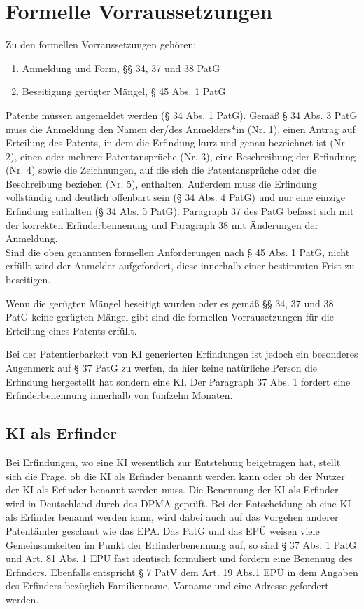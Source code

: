 \section{Formelle Vorraussetzungen}

Zu den formellen Vorraussetzungen gehören:
\begin{enumerate}
    \item Anmeldung und Form, §§ 34, 37 und 38 PatG 
    \vspace{-0.11in} 
    \item Beseitigung gerügter Mängel, § 45 Abs. 1 PatG
\end{enumerate}

Patente müssen angemeldet werden (§ 34 Abs. 1 PatG). 
Gemäß § 34 Abs. 3 PatG muss die Anmeldung den Namen der/des Anmelders*in 
(Nr. 1), einen Antrag auf Erteilung des Patents, 
in dem die Erfindung kurz und genau bezeichnet ist (Nr. 2), 
einen oder mehrere Patentansprüche (Nr. 3), 
eine Beschreibung der Erfindung (Nr. 4) sowie die Zeichnungen, 
auf die sich die Patentansprüche oder die Beschreibung beziehen (Nr. 5), 
enthalten. 
Außerdem muss die Erfindung vollständig und deutlich offenbart sein (§ 34 Abs. 4 PatG) 
und nur eine einzige Erfindung enthalten (§ 34 Abs. 5 PatG). 
Paragraph 37 des PatG befasst sich mit der korrekten Erfinderbennenung 
und Paragraph 38 mit Änderungen der Anmeldung. 
\\

Sind die oben genannten formellen Anforderungen nach § 45 Abs. 1 PatG, 
nicht erfüllt wird der Anmelder aufgefordert, 
diese innerhalb einer bestimmten Frist zu beseitigen.

Wenn die gerügten Mängel beseitigt wurden 
oder es gemäß §§ 34, 37 und 38 PatG keine gerügten Mängel gibt 
sind die formellen Vorrausetzungen für die Erteilung eines Patents erfüllt.

Bei der Patentierbarkeit von KI generierten Erfindungen ist jedoch 
ein besonderes Augenmerk
auf § 37 PatG zu werfen, da hier keine natürliche Person
die Erfindung hergestellt hat sondern eine KI. 
Der Paragraph 37 Abs. 1 fordert eine Erfinderbenennung
innerhalb von fünfzehn Monaten.

\subsection{KI als Erfinder}
Bei Erfindungen, wo eine KI wesentlich
zur Entstehung beigetragen hat, stellt sich die Frage,
ob die KI als Erfinder benannt werden kann oder
ob der Nutzer der KI als Erfinder benannt werden muss.
Die Benennung der KI als Erfinder wird in Deutschland 
durch das DPMA geprüft. Bei der Entscheidung
ob eine KI als Erfinder benannt werden kann,
wird dabei auch auf das Vorgehen anderer 
Patentämter geschaut wie das EPA. 
Das PatG und das EPÜ weisen viele Gemeinsamkeiten
im Punkt der Erfinderbenennung auf, so sind 
§ 37 Abs. 1 PatG und 
Art. 81 Abs. 1 EPÜ fast identisch formuliert und 
fordern eine Benennug des Erfinders.
Ebenfalls entspricht § 7 PatV dem 
Art. 19 Abs.1 EPÜ in dem Angaben des Erfinders
bezüglich Familienname, Vorname und eine Adresse gefordert 
werden. 

